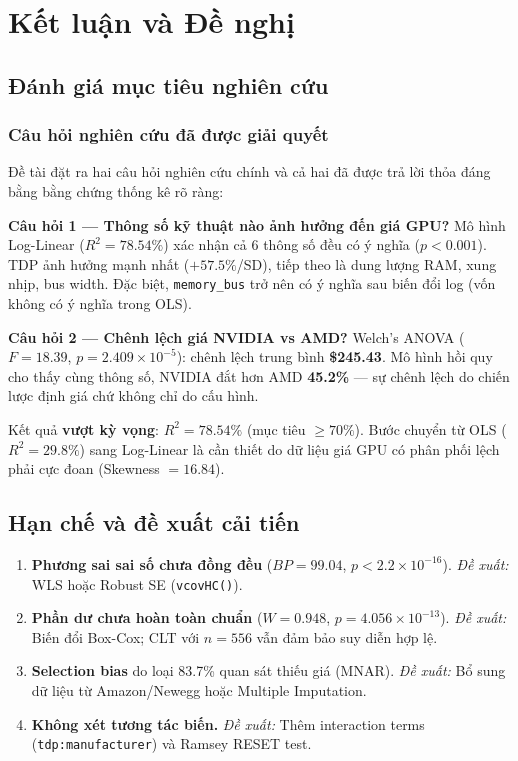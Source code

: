 \documentclass[a4paper]{article}
\begin{document}
\section{Kết luận và Đề nghị}

\subsection{Đánh giá mục tiêu nghiên cứu}

\subsubsection{Câu hỏi nghiên cứu đã được giải quyết}

Đề tài đặt ra hai câu hỏi nghiên cứu chính và cả hai đã được trả lời thỏa đáng bằng bằng chứng thống kê rõ ràng:

\textbf{Câu hỏi 1 --- Thông số kỹ thuật nào ảnh hưởng đến giá GPU?} Mô hình Log-Linear ($R^2 = 78.54\%$) xác nhận cả 6 thông số đều có ý nghĩa ($p < 0.001$). TDP ảnh hưởng mạnh nhất ($+57.5\%$/SD), tiếp theo là dung lượng RAM, xung nhịp, bus width. Đặc biệt, \texttt{memory\_bus} trở nên có ý nghĩa sau biến đổi log (vốn không có ý nghĩa trong OLS).

\textbf{Câu hỏi 2 --- Chênh lệch giá NVIDIA vs AMD?} Welch's ANOVA ($F = 18.39$, $p = 2.409 \times 10^{-5}$): chênh lệch trung bình \textbf{\$245.43}. Mô hình hồi quy cho thấy cùng thông số, NVIDIA đắt hơn AMD \textbf{45.2\%} --- sự chênh lệch do chiến lược định giá chứ không chỉ do cấu hình.

Kết quả \textbf{vượt kỳ vọng}: $R^2 = 78.54\%$ (mục tiêu $\geq 70\%$). Bước chuyển từ OLS ($R^2 = 29.8\%$) sang Log-Linear là cần thiết do dữ liệu giá GPU có phân phối lệch phải cực đoan (Skewness $= 16.84$).

\subsection{Hạn chế và đề xuất cải tiến}

\begin{enumerate}
  \item \textbf{Phương sai sai số chưa đồng đều} ($BP = 99.04$, $p < 2.2 \times 10^{-16}$). \textit{Đề xuất:} WLS hoặc Robust SE (\texttt{vcovHC()}).
  \item \textbf{Phần dư chưa hoàn toàn chuẩn} ($W = 0.948$, $p = 4.056 \times 10^{-13}$). \textit{Đề xuất:} Biến đổi Box-Cox; CLT với $n = 556$ vẫn đảm bảo suy diễn hợp lệ.
  \item \textbf{Selection bias} do loại 83.7\% quan sát thiếu giá (MNAR). \textit{Đề xuất:} Bổ sung dữ liệu từ Amazon/Newegg hoặc Multiple Imputation.
  \item \textbf{Không xét tương tác biến.} \textit{Đề xuất:} Thêm interaction terms (\texttt{tdp:manufacturer}) và Ramsey RESET test.
\end{enumerate}
\end{document}
